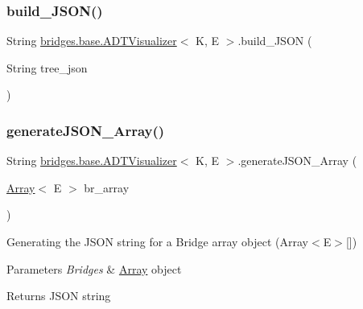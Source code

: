 \subsubsection{\texorpdfstring{build\+\_\+\+J\+S\+O\+N()}{build\_JSON()}\hspace{0.1cm}{\footnotesize\ttfamily [2/2]}}
{\footnotesize\ttfamily String \hyperlink{classbridges_1_1base_1_1_a_d_t_visualizer}{bridges.\+base.\+A\+D\+T\+Visualizer}$<$ K, E $>$.build\+\_\+\+J\+S\+ON (\begin{DoxyParamCaption}\item[{String}]{tree\+\_\+json }\end{DoxyParamCaption})}

\hypertarget{classbridges_1_1base_1_1_a_d_t_visualizer_a1f37c20302432878a91c03544b81cc27}{}\label{classbridges_1_1base_1_1_a_d_t_visualizer_a1f37c20302432878a91c03544b81cc27} 
\subsubsection{\texorpdfstring{generate\+J\+S\+O\+N\+\_\+\+Array()}{generateJSON\_Array()}\hspace{0.1cm}{\footnotesize\ttfamily [1/2]}}
{\footnotesize\ttfamily String \hyperlink{classbridges_1_1base_1_1_a_d_t_visualizer}{bridges.\+base.\+A\+D\+T\+Visualizer}$<$ K, E $>$.generate\+J\+S\+O\+N\+\_\+\+Array (\begin{DoxyParamCaption}\item[{\hyperlink{classbridges_1_1base_1_1_array}{Array}$<$ E $>$}]{br\+\_\+array }\end{DoxyParamCaption})}

Generating the J\+S\+ON string for a Bridge array object (Array$<$\+E$>$\mbox{[}\mbox{]})


\begin{DoxyParams}{Parameters}
{\em Bridges} & \hyperlink{classbridges_1_1base_1_1_array}{Array} object\\
\hline
\end{DoxyParams}
\begin{DoxyReturn}{Returns}
J\+S\+ON string 
\end{DoxyReturn}
\hypertarget{classbridges_1_1base_1_1_a_d_t_visualizer_a309d4f0521b66bb1329c0362f1ca5d33}{}\label{classbridges_1_1base_1_1_a_d_t_visualizer_a309d4f0521b66bb1329c0362f1ca5d33} 
